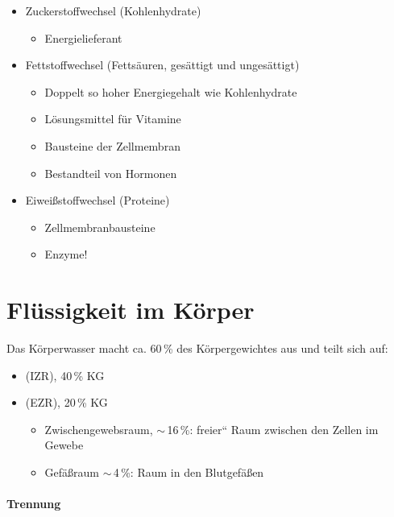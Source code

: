 \begin{itemize}
    \item Zuckerstoffwechsel (Kohlenhydrate)
    \begin{itemize}
        \item Energielieferant
    \end{itemize}
    \item Fettstoffwechsel (Fettsäuren, gesättigt und  ungesättigt)
    \begin{itemize}
        \item Doppelt so hoher Energiegehalt wie  Kohlenhydrate
        \item Lösungsmittel für Vitamine
        \item Bausteine der Zellmembran
        \item Bestandteil von Hormonen
    \end{itemize}
    \item Eiweißstoffwechsel (Proteine)
    \begin{itemize}
        \item Zellmembranbausteine
        \item Enzyme!
    \end{itemize}
\end{itemize}






\clearpage
\section{Flüssigkeit im Körper}
 
Das Körperwasser macht ca. 60\,\% des Körpergewichtes
aus und teilt sich auf:

\begin{itemize}
    \item {} (IZR), 40\,\% KG
    \item {} (EZR), 20\,\% KG
    \begin{itemize}
        \item {}Zwischengewebsraum,
        $\sim$\,16\,\%: {\quotedblbase}freier{\textquotedblleft}
        Raum zwischen den Zellen im Gewebe
        \item {}Gefäßraum $\sim$\,4\,\%:
        Raum in den Blutgefäßen
    \end{itemize}
\end{itemize}

\paragraph{Trennung} 

